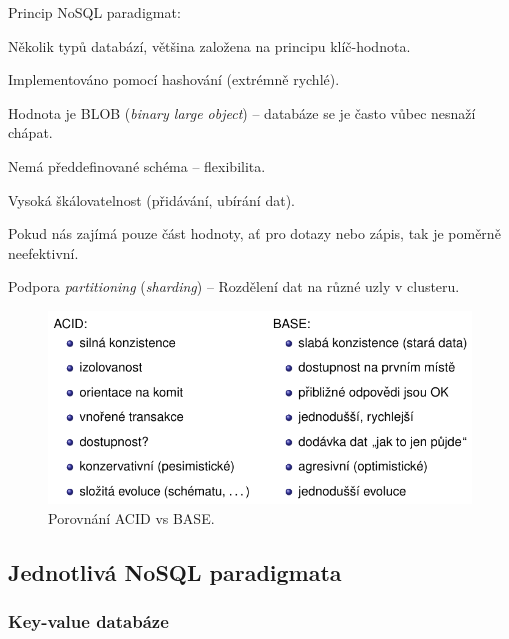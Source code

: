 \begin{compactitem}
    \item Princip NoSQL paradigmat: \begin{compactitem}
        \item Několik typů databází, většina založena na principu klíč-hodnota.
        \item Implementováno pomocí hashování (extrémně rychlé).
        \item Hodnota je BLOB (\textit{binary large object}) -- databáze se je často vůbec nesnaží chápat.
        \item Nemá předdefinované schéma -- flexibilita.
        \item Vysoká škálovatelnost (přidávání, ubírání dat).
        \item Pokud nás zajímá pouze část hodnoty, ať pro dotazy nebo zápis, tak je poměrně neefektivní.
    \end{compactitem}

    \item Podpora \textit{partitioning} (\textit{sharding}) -- Rozdělení dat na různé uzly v clusteru.
\end{compactitem}

\begin{figure}[H]
    \centering
    \includegraphics[width=1\linewidth]{acid-vs-base.pdf}
    \caption{Porovnání ACID vs BASE.}
\end{figure}

\subsection{Jednotlivá NoSQL paradigmata}

\subsubsection*{Key-value databáze}

